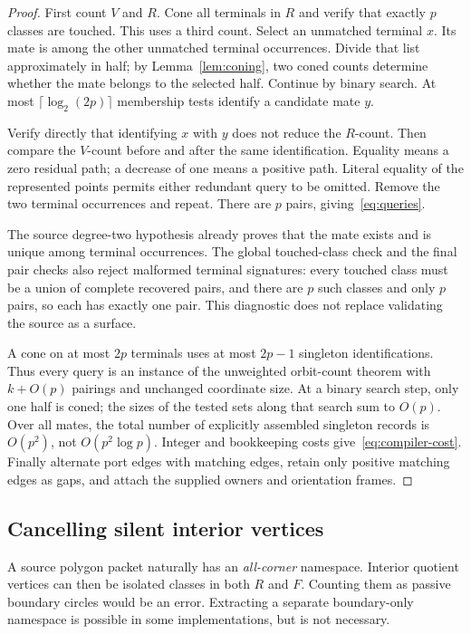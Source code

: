 \documentclass[11pt]{article}
\theoremstyle{definition}
\theoremstyle{remark}\newtheorem{remark}[theorem]{Remark}
\begin{document}
\begin{proof}
First count $V$ and $R$. Cone all terminals in $R$ and verify that exactly $p$ classes are touched. This uses a third count. Select an unmatched terminal $x$. Its mate is among the other unmatched terminal occurrences. Divide that list approximately in half; by Lemma~\ref{lem:coning}, two coned counts determine whether the mate belongs to the selected half. Continue by binary search. At most $\lceil\log_2(2p)\rceil$ membership tests identify a candidate mate $y$.

Verify directly that identifying $x$ with $y$ does not reduce the $R$-count. Then compare the $V$-count before and after the same identification. Equality means a zero residual path; a decrease of one means a positive path. Literal equality of the represented points permits either redundant query to be omitted. Remove the two terminal occurrences and repeat. There are $p$ pairs, giving~\eqref{eq:queries}.

The source degree-two hypothesis already proves that the mate exists and is unique among terminal occurrences. The global touched-class check and the final pair checks also reject malformed terminal signatures: every touched class must be a union of complete recovered pairs, and there are $p$ such classes and only $p$ pairs, so each has exactly one pair. This diagnostic does not replace validating the source as a surface.

A cone on at most $2p$ terminals uses at most $2p-1$ singleton identifications. Thus every query is an instance of the unweighted orbit-count theorem with $k+O(p)$ pairings and unchanged coordinate size. At a binary search step, only one half is coned; the sizes of the tested sets along that search sum to $O(p)$. Over all mates, the total number of explicitly assembled singleton records is $O(p^2)$, not $O(p^2\log p)$. Integer and bookkeeping costs give~\eqref{eq:compiler-cost}. Finally alternate port edges with matching edges, retain only positive matching edges as gaps, and attach the supplied owners and orientation frames.
\end{proof}

\subsection{Cancelling silent interior vertices}
A source polygon packet naturally has an \emph{all-corner} namespace. Interior quotient vertices can then be isolated classes in both $R$ and $F$. Counting them as passive boundary circles would be an error. Extracting a separate boundary-only namespace is possible in some implementations, but is not necessary.
\end{document}
